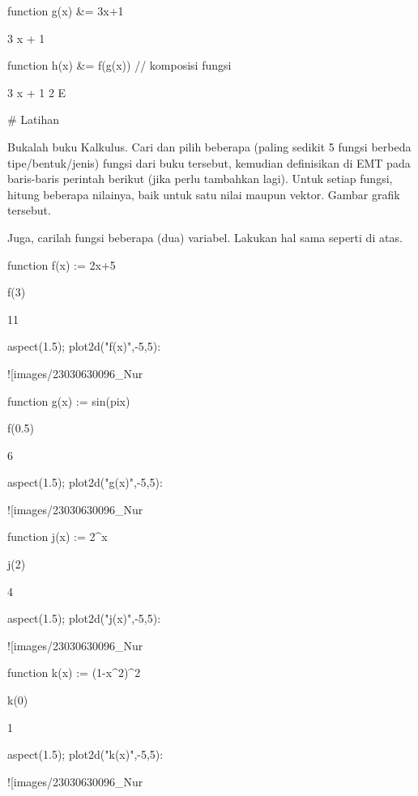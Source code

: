 \documentclass{article}
\begin{document}
\>function g(x) &= 3\*x+1


    
                                   3 x + 1
    

\>function h(x) &= f(g(x)) // komposisi fungsi


    
                                     3 x + 1
                                  2 E
    

# Latihan

Bukalah buku Kalkulus. Cari dan pilih beberapa (paling sedikit 5 fungsi berbeda
tipe/bentuk/jenis) fungsi dari buku tersebut, kemudian definisikan di EMT pada
baris-baris perintah berikut (jika perlu tambahkan lagi). Untuk setiap fungsi, hitung
beberapa nilainya, baik untuk satu nilai maupun vektor. Gambar grafik tersebut.


Juga, carilah fungsi beberapa (dua) variabel. Lakukan hal sama seperti di atas.


\>function f(x) := 2\*x+5

\>f(3)


    11

\>aspect(1.5); plot2d("f(x)",-5,5):


![images/23030630096_Nur%

\>function g(x) := sin(pi\*x)

\>f(0.5)


    6

\>aspect(1.5); plot2d("g(x)",-5,5):


![images/23030630096_Nur%

\>function j(x) := 2^x

\> j(2)


    4

\>aspect(1.5); plot2d("j(x)",-5,5):


![images/23030630096_Nur%

\>function k(x) := (1-x^2)^2

\> k(0)


    1

\>aspect(1.5); plot2d("k(x)",-5,5):


![images/23030630096_Nur%
\end{document}
